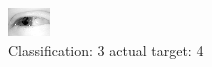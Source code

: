\begin{figure}[h!]
\begin{center}
\includegraphics[width=0.60\columnwidth]{figures/ID2457_class_3_target_4.png}
\end{center}
\caption{ Classification: 3 actual target: 4}
\label{fig:ID2457_class_3_target_4}
\end{figure}
